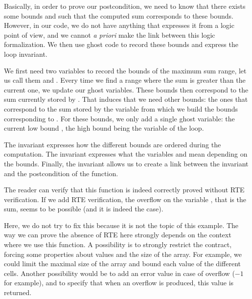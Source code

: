 Basically, in order to prove our postcondition, we need to know that there
exists some bounds
 and  such that the computed sum corresponds to
these bounds. However, in our code, we do not have anything that expresses
it from a logic point of view, and we cannot \emph{a priori} make the
link between this logic formalization. We then use ghost code to
record these bounds and express the loop invariant.


We first need two variables to record the bounds
of the maximum sum range, let us call them  and
. Every time we find a range where the sum is greater
than the current one, we update our ghost variables. These bounds
then correspond to the sum currently stored by . That
induces that we need other bounds: the ones that correspond to the sum
stored by the variable  from which we build the bounds
corresponding to . For these bounds, we only add a
single ghost variable: the current low bound , the high
bound being the variable  of the loop.






The invariant  expresses how the different bounds are
ordered during the computation. The invariant  expresses
what the variables  and  mean depending on the
bounds. Finally, the invariant  allows us to create a link
between the invariant and the postcondition of the function.



The reader can verify that this function is indeed correctly proved
without RTE verification. If we add RTE verification, the overflow on
the variable , that is the sum, seems to be possible (and it
is indeed the case).



Here, we do not try to fix this because it is not the topic of this
example. The way we can prove the absence of RTE here strongly depends
on the context where we use this function. A possibility is to strongly
restrict the contract, forcing some properties about values and the size
of the array. For example, we could limit the maximal size of the array
and bound each value of the different cells. Another possibility would be to
add an error value in case of overflow
(\(-1\) for example), and to specify that when an overflow is produced,
this value is returned.



